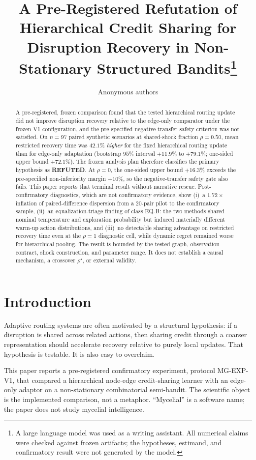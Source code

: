 \documentclass{article}
\title{A Pre-Registered Refutation of Hierarchical Credit Sharing for Disruption Recovery in Non-Stationary Structured Bandits\thanks{A large language model was used as a writing assistant. All numerical claims were checked against frozen artifacts; the hypotheses, estimand, and confirmatory result were not generated by the model.}}
\author{Anonymous authors}
\begin{document}
\maketitle

\begin{abstract}
A pre-registered, frozen comparison found that the tested hierarchical routing update did not improve disruption recovery relative to the edge-only comparator under the frozen V1 configuration, and the pre-specified negative-transfer safety criterion was not satisfied.
On $n=97$ paired synthetic scenarios at shared-shock fraction $\rho=0.50$, mean restricted recovery time was $42.1\%$ \emph{higher} for the fixed hierarchical routing update than for edge-only adaptation (bootstrap $95\%$ interval $+11.9\%$ to $+79.1\%$; one-sided upper bound $+72.1\%$).
The frozen analysis plan therefore classifies the primary hypothesis as \textbf{REFUTED}.
At $\rho=0$, the one-sided upper bound $+16.3\%$ exceeds the pre-specified non-inferiority margin $+10\%$, so the negative-transfer safety gate also fails.
This paper reports that terminal result without narrative rescue.
Post-confirmatory diagnostics, which are not confirmatory evidence, show (i)~a $1.72\times$ inflation of paired-difference dispersion from a $20$-pair pilot to the confirmatory sample, (ii)~an equalization-triage finding of class EQ-B: the two methods shared nominal temperature and exploration probability but induced materially different warm-up action distributions, and (iii)~no detectable sharing advantage on restricted recovery time even at the $\rho=1$ diagnostic cell, while dynamic regret remained worse for hierarchical pooling.
The result is bounded by the tested graph, observation contract, shock construction, and parameter range.
It does not establish a causal mechanism, a crossover $\rho^\star$, or external validity.
\end{abstract}

\section{Introduction}

Adaptive routing systems are often motivated by a structural hypothesis: if a disruption is shared across related actions, then sharing credit through a coarser representation should accelerate recovery relative to purely local updates.
That hypothesis is testable.
It is also easy to overclaim.

This paper reports a pre-registered confirmatory experiment, protocol MG-EXP-V1, that compared a hierarchical node-edge credit-sharing learner with an edge-only adaptor on a non-stationary combinatorial semi-bandit.
The scientific object is the implemented comparison, not a metaphor.
``Mycelial'' is a software name; the paper does not study mycelial intelligence.
\end{document}
